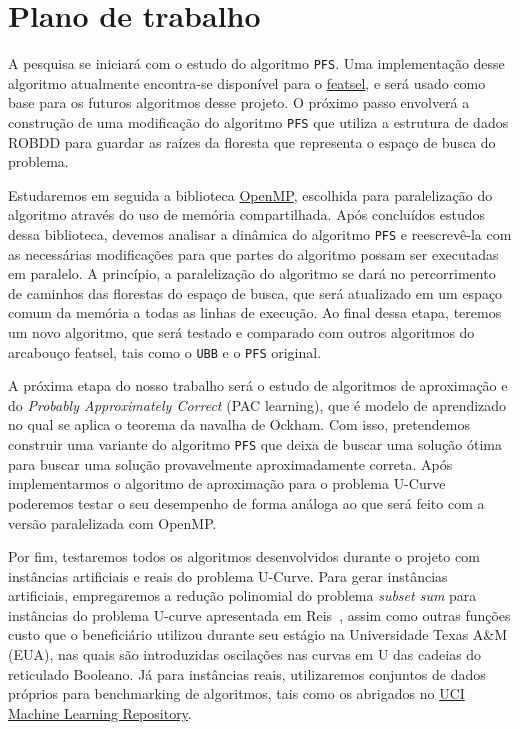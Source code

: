 \documentclass[12pt]{article}
\begin{document}
\section{Plano de trabalho}
A pesquisa se iniciará com o estudo do algoritmo {\tt PFS}. Uma implementação desse algoritmo atualmente encontra-se disponível para o  
\href{https://github.com/msreis/featsel}{featsel}, e será 
usado como base para os futuros algoritmos desse projeto. O próximo 
passo envolverá a construção de uma modificação do algoritmo {\tt PFS}
que utiliza a estrutura de dados ROBDD para guardar as raízes da 
floresta que representa o espaço de busca do problema.

Estudaremos em seguida a biblioteca \href{http://www.openmp.org/}{OpenMP}, escolhida para paralelização
do algoritmo através do uso de memória compartilhada. Após concluídos estudos dessa biblioteca, devemos analisar a
dinâmica do algoritmo {\tt PFS} e reescrevê-la com as necessárias 
modificações para que partes do algoritmo possam ser executadas em
paralelo. A princípio, a paralelização do algoritmo se dará no 
percorrimento de caminhos das florestas do espaço de busca, que será 
atualizado em um espaço comum da memória a todas as linhas de execução.
Ao final dessa etapa, teremos um novo algoritmo, que será testado
e comparado com outros algoritmos do arcabouço featsel, tais como o {\tt UBB} e o {\tt PFS} original.

A próxima etapa do nosso trabalho será o estudo de algoritmos de 
aproximação e do \textit{Probably Approximately
Correct} (PAC learning), que é modelo de aprendizado no qual se aplica o teorema da navalha de Ockham. Com isso, pretendemos construir uma variante do algoritmo {\tt PFS} que deixa de buscar uma solução ótima para buscar
uma solução provavelmente aproximadamente correta. Após implementarmos o algoritmo de aproximação para o problema U-Curve
poderemos testar o seu desempenho de forma análoga ao que será feito com a versão paralelizada com OpenMP.

Por fim, testaremos todos os algoritmos desenvolvidos durante o projeto
com instâncias artificiais e reais do problema U-Curve. Para gerar instâncias artificiais, empregaremos a redução polinomial do problema {\em subset sum} para instâncias do problema U-curve apresentada em Reis~\cite{msreis thesis}, assim como outras funções custo que o beneficiário utilizou durante seu estágio na Universidade Texas A\&M (EUA), nas quais são introduzidas oscilações nas curvas em U das cadeias do reticulado Booleano. Já para instâncias reais, utilizaremos conjuntos de dados próprios para benchmarking de algoritmos, tais como os abrigados no \href{archive.ics.uci.edu/ml}{UCI Machine Learning Repository}.
\end{document}
